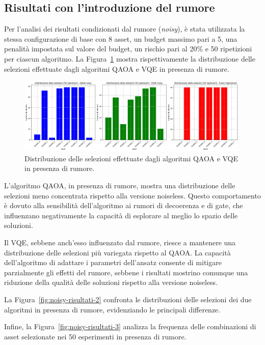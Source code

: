 \subsection{Risultati con l'introduzione del rumore}

Per l'analisi dei risultati condizionati dal rumore (\textit{noisy}), 
è stata utilizzata la stessa configurazione 
di base con 8 asset, un budget massimo pari a 5, una penalità impostata sul valore 
del budget, un rischio pari al 20\% e 50 ripetizioni per ciascun algoritmo. 
La Figura~\ref{fig:noisy-risultati-1} mostra rispettivamente la distribuzione 
delle selezioni effettuate dagli algoritmi QAOA e VQE in presenza di rumore.

\begin{figure}[ht!]
    \centering
    \includegraphics[width=0.99\textwidth]{images/risultati/noisy-risultati-1.png}
    \caption{Distribuzione delle selezioni effettuate dagli algoritmi QAOA e VQE in presenza di rumore.}
    \label{fig:noisy-risultati-1}
\end{figure}

L'algoritmo QAOA, in presenza di rumore, mostra una distribuzione delle selezioni 
meno concentrata rispetto alla versione noiseless. Questo comportamento 
è dovuto alla sensibilità dell'algoritmo ai rumori di decoerenza e di gate, 
che influenzano negativamente la capacità di esplorare al meglio lo spazio 
delle soluzioni. 

Il VQE, sebbene anch'esso influenzato dal rumore, riesce a mantenere una 
distribuzione delle selezioni più variegata rispetto al QAOA. La capacità 
dell'algoritmo di adattare i parametri dell'ansatz consente di mitigare 
parzialmente gli effetti del rumore, sebbene i risultati mostrino comunque 
una riduzione della qualità delle soluzioni rispetto alla versione noiseless.

La Figura~\ref{fig:noisy-risultati-2} confronta le distribuzioni delle selezioni 
dei due algoritmi in presenza di rumore, evidenziando le principali differenze. 

Infine, la Figura~\ref{fig:noisy-risultati-3} analizza la frequenza delle combinazioni 
di asset selezionate nei 50 esperimenti in presenza di rumore.

